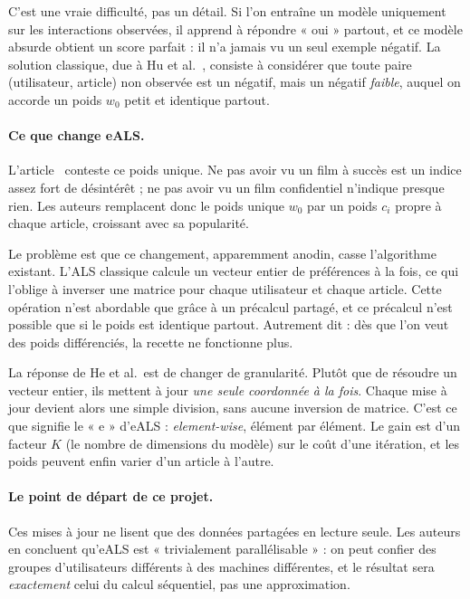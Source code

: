 \documentclass[11pt,a4paper]{article}
\begin{document}
C'est une vraie difficulté, pas un détail. Si l'on entraîne un modèle uniquement sur
les interactions observées, il apprend à répondre « oui » partout, et ce modèle absurde
obtient un score parfait : il n'a jamais vu un seul exemple négatif. La solution
classique, due à Hu et al.~\cite{hu2008implicit}, consiste à considérer que toute paire
(utilisateur, article) non observée est un négatif, mais un négatif \emph{faible},
auquel on accorde un poids $w_0$ petit et identique partout.

\paragraph{Ce que change eALS.} L'article~\cite{he2016eals} conteste ce poids unique.
Ne pas avoir vu un film à succès est un indice assez fort de désintérêt ; ne pas avoir
vu un film confidentiel n'indique presque rien. Les auteurs remplacent donc le poids
unique $w_0$ par un poids $c_i$ propre à chaque article, croissant avec sa popularité.

Le problème est que ce changement, apparemment anodin, casse l'algorithme existant.
L'ALS classique calcule un vecteur entier de préférences à la fois, ce qui l'oblige à
inverser une matrice pour chaque utilisateur et chaque article. Cette opération n'est
abordable que grâce à un précalcul partagé, et ce précalcul n'est possible que si le
poids est identique partout. Autrement dit : dès que l'on veut des poids différenciés,
la recette ne fonctionne plus.

La réponse de He et al.\ est de changer de granularité. Plutôt que de résoudre un
vecteur entier, ils mettent à jour \emph{une seule coordonnée à la fois}. Chaque mise à
jour devient alors une simple division, sans aucune inversion de matrice. C'est ce que
signifie le « e » d'eALS : \emph{element-wise}, élément par élément. Le gain est d'un
facteur $K$ (le nombre de dimensions du modèle) sur le coût d'une itération, et les
poids peuvent enfin varier d'un article à l'autre.

\paragraph{Le point de départ de ce projet.} Ces mises à jour ne lisent que des données
partagées en lecture seule. Les auteurs en concluent qu'eALS est « trivialement
parallélisable » : on peut confier des groupes d'utilisateurs différents à des machines
différentes, et le résultat sera \emph{exactement} celui du calcul séquentiel, pas une
approximation.
\end{document}
